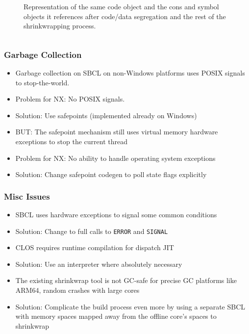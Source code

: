 \documentclass[14pt,t,aspectratio=169]{beamer}
\begin{document}
\begin{frame}
  \begin{figure}
    \begin{columns}
      \vspace{-1.7em}
      \phantom{123}
      
      Representation of the same code object and the cons and
      symbol objects it references after code/data segregation and the
      rest of the shrinkwrapping process.
    \end{columns}
  \end{figure}
\end{frame}

\begin{frame}
  \frametitle{Garbage Collection}
  \begin{itemize}
  \item Garbage collection on SBCL on non-Windows platforms uses POSIX
    signals to stop-the-world.
  \item \Rightarrow{} Problem for NX: No POSIX signals.
  \item Solution: Use safepoints (implemented already on Windows)
  \item BUT: The safepoint mechanism still uses virtual memory
    hardware exceptions to stop the current thread
  \item \Rightarrow{} Problem for NX: No ability to handle operating system
    exceptions
  \item Solution: Change safepoint codegen to poll state flags
    explicitly
  \end{itemize}
\end{frame}

\begin{frame}
  \frametitle{Misc Issues}
  \begin{itemize}
  \item SBCL uses hardware exceptions to signal some common conditions
  \item \Rightarrow{} Solution: Change to full calls to \texttt{ERROR} and \texttt{SIGNAL}
  \item CLOS requires runtime compilation for dispatch JIT
  \item \Rightarrow{} Solution: Use an interpreter where absolutely necessary
  \item The existing shrinkwrap tool is not GC-safe for precise GC
    platforms like ARM64, random crashes with large cores
  \item  \Rightarrow{} Solution: Complicate the build process even more by using
    a separate SBCL with memory spaces mapped away from the offline
    core's spaces to shrinkwrap
  \end{itemize}
\end{frame}
\end{document}
